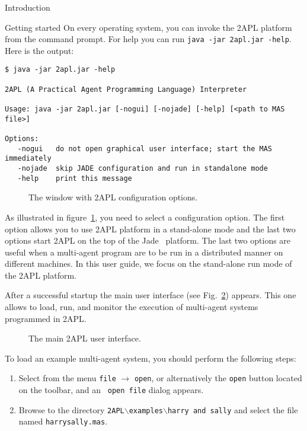 \begin{chapter}{Introduction}
\begin{section}{Getting started}
On every operating system, you can invoke the 2APL platform from the command prompt.
For help you can run \texttt{java -jar 2apl.jar -help}. Here is the output:
\begin{verbatim}
$ java -jar 2apl.jar -help
 
2APL (A Practical Agent Programming Language) Interpreter 
 
Usage: java -jar 2apl.jar [-nogui] [-nojade] [-help] [<path to MAS file>] 
 
Options: 
   -nogui   do not open graphical user interface; start the MAS immediately 
   -nojade  skip JADE configuration and run in standalone mode 
   -help    print this message 
\end{verbatim}

    \begin{figure}
        \begin{center}
            \caption{The window with 2APL configuration options.}\label{fig:configuration}
        \end{center}
    \end{figure}

As illustrated in figure~\ref{fig:configuration}, you need to select
a configuration option. The first option allows you to use 2APL
platform in a stand-alone mode and the last two options start 2APL
on the top of the Jade~\cite{jade2005} platform. The last two
options are useful when a multi-agent program are to be run in a
distributed manner on different machines. In this user guide, we
focus on the stand-alone run mode of the 2APL platform.

After a successful startup the main user interface (see Fig.~\ref{fig:mainscreen}) appears. 
This one allows to load, run, and monitor the
execution of multi-agent systems programmed in 2APL.

    \begin{figure}
        \begin{center}
            \caption{The main 2APL user interface.}\label{fig:mainscreen}
        \end{center}
    \end{figure}

To load an example multi-agent system, you should perform the
following steps:
\begin{enumerate}
    \item Select from the menu {\tt file} $\rightarrow$ {\tt open}, or
    alternatively the {\tt open} button located on the toolbar, and an {\tt
    open file} dialog appears.
    \item Browse to the directory {\tt 2APL}$\backslash${\tt examples}$\backslash${\tt harry and sally} and
    select the file named {\tt harrysally.mas}.
\end{enumerate}


\end{section}
\end{chapter}

